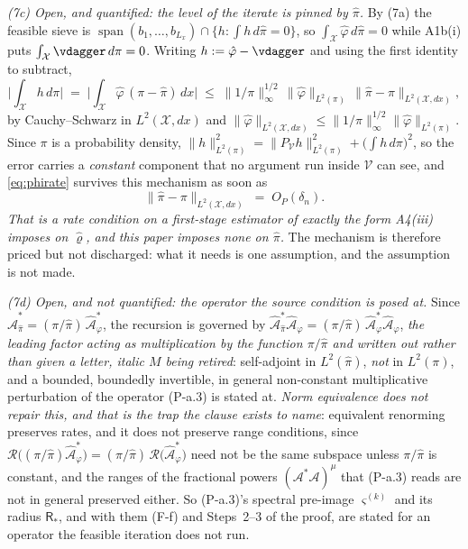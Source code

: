 \begin{remark}
\emph{(7c) Open, and quantified: the level of the iterate is pinned by $\hat\pi$.} By \textup{(7a)} the
feasible sieve is $\operatorname{span}(b_1,\dots,b_{L_x})\cap\{h:\int h\,d\hat\pi=0\}$, so
$\int_{\mathcal X}\hat\varphi\,d\hat\pi=0$ while A1b(i) puts
$\int_{\mathcal X}\vdagger\,d\pi=0$. Writing $h:=\hat\varphi-\vdagger$ and using the first identity to
subtract,
\[
\Big|\int_{\mathcal X}h\,d\pi\Big|
\;=\;\Big|\int_{\mathcal X}\hat\varphi\,(\pi-\hat\pi)\,dx\Big|
\;\le\;\|1/\pi\|^{1/2}_\infty\,\big\|\hat\varphi\big\|_{L^{2}(\pi)}\,
\big\|\hat\pi-\pi\big\|_{L^{2}(\mathcal X,dx)} ,
\]
by Cauchy--Schwarz in $L^{2}(\mathcal X,dx)$ and
$\|\hat\varphi\|_{L^{2}(\mathcal X,dx)}\le\|1/\pi\|^{1/2}_\infty\|\hat\varphi\|_{L^{2}(\pi)}$.
Since $\pi$ is a probability density, $\|h\|^{2}_{L^{2}(\pi)}=\|P_{\mathcal V}h\|^{2}_{L^{2}(\pi)}
+\big(\int h\,d\pi\big)^{2}$, so the error carries a \emph{constant} component that no argument run
inside $\mathcal V$ can see, and \eqref{eq:phirate} survives this mechanism as soon as
\[
\big\|\hat\pi-\pi\big\|_{L^{2}(\mathcal X,dx)}\;=\;O_P(\delta_n) .
\]
\emph{That is a rate condition on a first-stage estimator of exactly the form A4(iii) imposes on
$\hat\varrho$, and this paper imposes none on $\hat\pi$.} The mechanism is therefore priced but not
discharged: what it needs is one assumption, and the assumption is not made.

\emph{(7d) Open, and not quantified: the operator the source condition is posed at.} Since
$\hat{\mathcal A}^\ast_{\hat\pi}=(\pi/\hat\pi)\,\hat{\mathcal A}^\ast_\varphi$, the recursion is governed
by $\hat{\mathcal A}^\ast_{\hat\pi}\hat{\mathcal A}_\varphi
=(\pi/\hat\pi)\,\hat{\mathcal A}^\ast_\varphi\hat{\mathcal A}_\varphi$, \emph{the leading factor acting
as multiplication by the function $\pi/\hat\pi$ and written out rather than given a letter, italic $M$
being retired}: self-adjoint in $L^{2}(\hat\pi)$, \emph{not} in $L^{2}(\pi)$, and a bounded, boundedly
invertible, in general non-constant multiplicative perturbation of the operator (P-a.3) is stated at.
\emph{Norm
equivalence does not repair this, and that is the trap the clause exists to name}: equivalent renorming
preserves rates, and it does not preserve range conditions, since
$\mathcal R\big((\pi/\hat\pi)\hat{\mathcal A}^\ast_\varphi\big)
=(\pi/\hat\pi)\,\mathcal R\big(\hat{\mathcal A}^\ast_\varphi\big)$ need not be the same subspace unless
$\pi/\hat\pi$ is constant, and the ranges of the fractional powers
$(\mathcal A^\ast\mathcal A)^{\mu}$ that (P-a.3) reads are not in general preserved either. So
(P-a.3)'s spectral pre-image $\varsigma^{(k)}$ and its radius $\mathsf R_\ast$, and with them (F-f) and
Steps~2--3 of the proof, are stated for an operator the feasible iteration does not run.


\end{remark}
